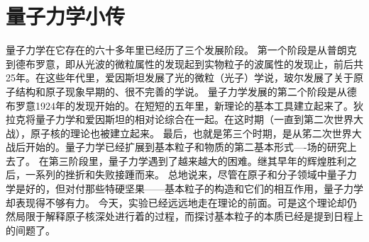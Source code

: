 \section{量子力学小传}

量子力学在它存在的六十多年里已经历了三个发展阶段。
第一个阶段是从普朗克到德布罗意，即从光波的微粒属性的发现起到实物粒子的波属性的发现止，前后共25年。在这些年代里，爱因斯坦发展了光的微粒（光子）学说，玻尔发展了关于原子结构和原子现象早期的、很不完善的学说。
量子力学发展的第二个阶段是从德布罗意1924年的发现开始的。在短短的五年里，新理论的基本工具建立起来了。狄拉克将量子力学和爱因斯坦的相对论综合在一起。在这时期（一直到第二次世界大战），原子核的理论也被建立起来。
最后，也就是笫三个时期，是从笫二次世界大战后开始的。量子力学已经扩展到基本粒子和物质的第二基本形式—-场的研究上去了。
在第三阶段里，量子力学遇到了越来越大的困难。继其早年的辉煌胜利之后，一系列的挫折和失败接踵而来。
总地说来，尽管在原子和分子领域中量子力学是好的，但对付那些特硬坚果——基本粒子的构造和它们的相互作用，量子力学却表现得不够有力。
今天，实验已经远远地走在理论的前面。可是这个理论却仍然局限于解释原子核深处进行着的过程，而探讨基本粒子的本质已经是提到日程上的间题了。


